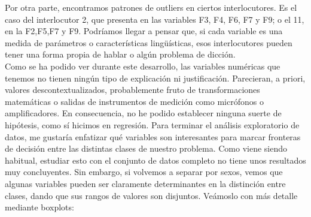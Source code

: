 Por otra parte, encontramos patrones de outliers en ciertos interlocutores. Es el caso del interlocutor 2, que presenta en las variables F3, F4, F6, F7 y F9; o el 11, en la F2,F5,F7 y F9. Podríamos llegar a pensar que, si cada variable es una medida de parámetros o características lingüísticas, esos interlocutores pueden tener una forma propia de hablar o algún problema de dicción. \\

Como se ha podido ver durante este desarrollo, las variables numéricas que tenemos no tienen ningún tipo de explicación ni justificación. Parecieran, a priori, valores descontextualizados, probablemente fruto de transformaciones matemáticas o salidas de instrumentos de medición como micrófonos o amplificadores. En consecuencia, no he podido establecer ninguna suerte de hipótesis, como sí hicimos en regresión. Para terminar el análisis exploratorio de datos, me gustaría enfatizar qué variables son interesantes para marcar fronteras de decisión entre las distintas clases de nuestro problema. Como viene siendo habitual, estudiar esto con el conjunto de datos completo no tiene unos resultados muy concluyentes. Sin embargo, si volvemos a separar por sexos, vemos que algunas variables pueden ser claramente determinantes en la distinción entre clases, dando que sus rangos de valores son disjuntos. Veámoslo con más detalle mediante boxplots:

